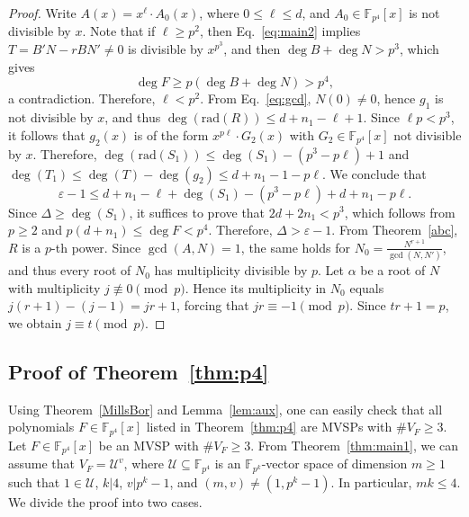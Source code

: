 \documentclass[11pt]{amsart}
\newcommand{\rad}{\mathrm{rad}}
\newcommand{\F}{\mathbb{F}}
\theoremstyle{definition}
\theoremstyle{remark}
\begin{document}
\begin{proof}
Write $A(x)=x^{\ell}\cdot A_0(x)$, where $0\le \ell\le d$, and $A_0\in \F_{p^4}[x]$ is not divisible by $x$. 
Note that if $\ell \geq p^2$, then Eq.~\eqref{eq:main2} implies $T=B'N-rBN'\neq 0$ is divisible by $x^{p^3}$, and then  $\deg B+ \deg N >p^3$, which gives
$$\deg F\geq p(\deg B+\deg N)>p^4,$$
a contradiction. Therefore, $\ell < p^2$. From Eq.~\eqref{eq:gcd}, $N(0)\ne 0$, hence $g_1$ is not divisible by $x$, and thus $\deg(\rad(R))\le d+n_1-\ell+1$. Since  $\ell p<p^3$, it follows that   $g_2(x)$ is of the form $x^{p\ell}\cdot G_2(x)$ with $G_2\in \F_{p^4}[x]$ not divisible by $x$. Therefore, $\deg(\rad(S_1))\le  \deg(S_1)-(p^3-p\ell)+1$ and 
$\deg(T_1)\le \deg(T)-\deg(g_2) \leq d+n_1-1-p\ell$. We conclude that
$$\varepsilon-1\leq  d+n_1-\ell+\deg(S_1)-(p^3-p\ell)+d+n_1-p\ell.$$
Since $\Delta\ge \deg(S_1)$, it suffices to prove that $2d+2n_1< p^3$, which follows from $p\geq 2$ and $p(d+n_1)\leq \deg F<p^4$. Therefore, $\Delta>\varepsilon-1$.
From Theorem~\ref{abc}, $R$ is a $p$-th power. Since $\gcd(A, N)=1$, the same holds for $N_0=\frac{N^{r+1}}{\gcd(N, N')}$, and thus every root of $N_0$ has multiplicity divisible by $p$. Let $\alpha$ be a root of $N$ with multiplicity $j\not\equiv 0\pmod p$. Hence its multiplicity in $N_0$ equals $j(r+1)-(j-1)=jr+1$, forcing that $jr\equiv -1\pmod p$. Since $tr+1=p$, we obtain  $j\equiv t\pmod p$.
\end{proof}


\subsection{Proof of Theorem~\ref{thm:p4}} Using Theorem~\ref{MillsBor} and Lemma~\ref{lem:aux}, one can easily check that all polynomials  $F\in  \F_{p^4}[x]$  listed  in  Theorem~\ref{thm:p4} are MVSPs  with $\# V_F\geq 3$.   Let $F \in \F_{p^4}[x]$ be an MVSP with $\#V_F\geq 3$.
From Theorem~\ref{thm:main1}, we can assume that $V_F=\mathcal U^v$, where $\mathcal U\subseteq \F_{p^4}$ is an $\F_{p^k}$-vector space of dimension $m\ge1$ such that $1\in\mathcal U$, $k|4$, $v|p^k-1$, and $(m, v)\ne (1, p^k-1)$. In particular, $mk\le 4$. We  divide the proof into two cases.
 
\end{document}
